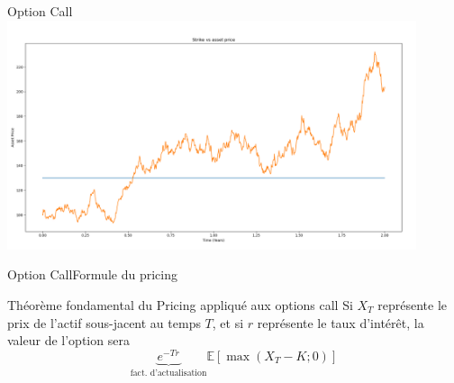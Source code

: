 \documentclass{beamer}
\newcommand{\1}{\mathmybb{1}}
\begin{document}
\begin{frame}{Option Call}
  \includegraphics[width=12cm]{imgs/strike.png}
\end{frame}
\begin{frame}{Option Call}{Formule du pricing}
\begin{block}{Théorème fondamental du Pricing appliqué aux options call}
    Si $X_T$  représente le prix de l'actif sous-jacent au temps $T$, et si $r$ représente le taux d'intérêt, la valeur de l'option sera
    \begin{equation} \label{tfp}
      \underbrace{e^{-Tr}}_{\text{fact. d'actualisation}}\mathbb{E}\left[ \max \left(X_{T} - K; 0 \right) \right]
    \end{equation}
  \end{block}
\end{frame}
\end{document}
